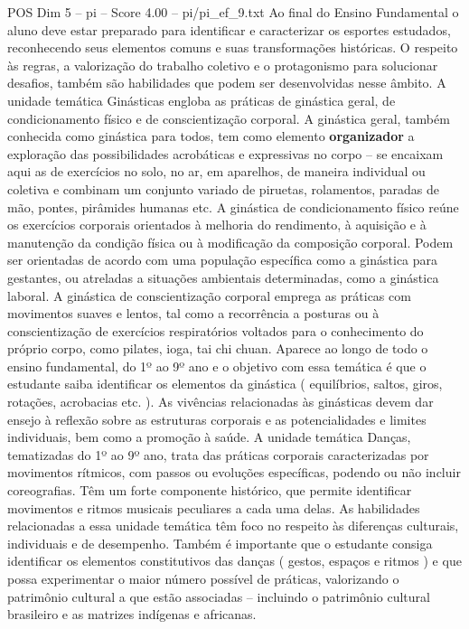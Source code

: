\begin{textsample}{POS Dim 5 – pi – Score 4.00 – pi/pi\_ef\_9.txt}
Ao final do Ensino Fundamental o aluno deve estar preparado para identificar e caracterizar os esportes estudados, reconhecendo seus elementos comuns e suas transformações históricas.
O respeito às regras, a valorização do trabalho coletivo e o protagonismo para solucionar desafios, também são habilidades que podem ser desenvolvidas nesse âmbito.
A unidade temática Ginásticas engloba as práticas de ginástica geral, de condicionamento físico e de conscientização corporal.
A ginástica geral, também conhecida como ginástica para todos, tem como elemento \textbf{organizador} a exploração das possibilidades acrobáticas e expressivas no corpo – se encaixam aqui as de exercícios no solo, no ar, em aparelhos, de maneira individual ou coletiva e combinam um conjunto variado de piruetas, rolamentos, paradas de mão, pontes, pirâmides humanas etc.
A ginástica de condicionamento físico reúne os exercícios corporais orientados à melhoria do rendimento, à aquisição e à manutenção da condição física ou à modificação da composição corporal.
Podem ser orientadas de acordo com uma população específica como a ginástica para gestantes, ou atreladas a situações ambientais determinadas, como a ginástica laboral.
A ginástica de conscientização corporal emprega as práticas com movimentos suaves e lentos, tal como a recorrência a posturas ou à conscientização de exercícios respiratórios voltados para o conhecimento do próprio corpo, como pilates, ioga, tai chi chuan.
Aparece ao longo de todo o ensino fundamental, do 1º ao 9º ano e o objetivo com essa temática é que o estudante saiba identificar os elementos da ginástica ( equilíbrios, saltos, giros, rotações, acrobacias etc. ).
As vivências relacionadas às ginásticas devem dar ensejo à reflexão sobre as estruturas corporais e as potencialidades e limites individuais, bem como a promoção à saúde.
A unidade temática Danças, tematizadas do 1º ao 9º ano, trata das práticas corporais caracterizadas por movimentos rítmicos, com passos ou evoluções específicas, podendo ou não incluir coreografias.
Têm um forte componente histórico, que permite identificar movimentos e ritmos musicais peculiares a cada uma delas.
As habilidades relacionadas a essa unidade temática têm foco no respeito às diferenças culturais, individuais e de desempenho.
Também é importante que o estudante consiga identificar os elementos constitutivos das danças ( gestos, espaços e ritmos ) e que possa experimentar o maior número possível de práticas, valorizando o patrimônio cultural a que estão associadas – incluindo o patrimônio cultural brasileiro e as matrizes indígenas e africanas.

\end{textsample}

